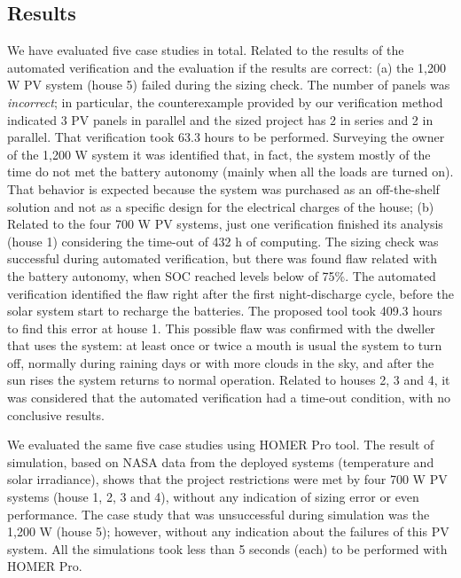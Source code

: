 \documentclass[journal]{IEEEtran}
\begin{document}
\subsection{Results}
\label{sec:results_indeed}
%
%
We have evaluated five case studies in total. Related to the results of the automated verification and the evaluation if the results are correct: (a) the 1,200 W PV system (house 5) failed during the sizing check. The number of panels was \textit{incorrect}; in particular, the counterexample provided by our verification method indicated 3 PV panels in parallel and the sized project has 2 in series and 2 in parallel. That verification took 63.3 hours to be performed. Surveying the owner of the 1,200 W system it was identified that, in fact, the system mostly of the time do not met the battery autonomy (mainly when all the loads are turned on). That behavior is expected because the system was purchased as an off-the-shelf solution and not as a specific design for the electrical charges of the house; (b) Related to the four 700 W PV systems, just one verification finished its analysis (house 1) considering the time-out of 432 h of computing. The sizing check was successful during automated verification, but there was found flaw related with the battery autonomy, when SOC reached levels below of 75\%. The automated verification identified the flaw right after the first night-discharge cycle, before the solar system start to recharge the batteries. The proposed tool took 409.3 hours to find this error at house 1. This possible flaw was confirmed with the dweller that uses the system: at least once or twice a mouth is usual the system to turn off, normally during raining days or with more clouds in the sky, and after the sun rises the system returns to normal operation. Related to houses 2, 3 and 4, it was considered that the automated verification had a time-out condition, with no conclusive results.

We evaluated the same five case studies using HOMER Pro tool. The result of simulation, based on NASA data from the deployed systems (temperature and solar irradiance), shows that the project restrictions were met by four 700 W PV systems (house 1, 2, 3 and 4), without any indication of sizing error or even performance. The case study that was unsuccessful during simulation was the 1,200 W (house 5); however, without any indication about the failures of this PV system. All the simulations took less than 5 seconds (each) to be performed with HOMER Pro.
\end{document}
